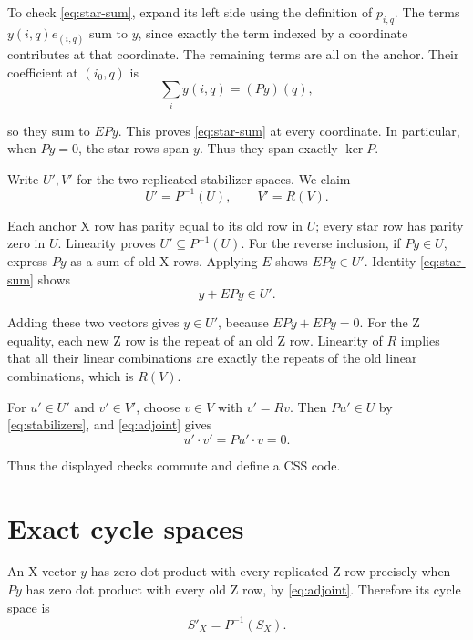 \documentclass{article}
\begin{document}
To check \eqref{eq:star-sum}, expand its left side using the definition of \(p_{i,q}\).
The terms \(y(i,q)e_{(i,q)}\) sum to \(y\), since exactly the term indexed
by a coordinate contributes at that coordinate. The remaining terms
are all on the anchor. Their coefficient at \((i_0,q)\) is
\begin{equation}\label{eq:anchor-coefficient}
\sum_i y(i,q)=(Py)(q),
\end{equation}

so they sum to \(EPy\). This proves \eqref{eq:star-sum} at every coordinate. In particular,
when \(Py=0\), the star rows span \(y\). Thus they span exactly \(\ker P\).

Write \(U',V'\) for the two replicated stabilizer spaces. We claim
\begin{equation}\label{eq:stabilizers}
U'=P^{-1}(U),\qquad V'=R(V).
\end{equation}

Each anchor X row has parity equal to its old row in \(U\); every star
row has parity zero in \(U\). Linearity proves \(U'\subseteq P^{-1}(U)\).
For the reverse inclusion, if \(Py\in U\), express \(Py\) as a sum of old
X rows. Applying \(E\) shows \(EPy\in U'\). Identity \eqref{eq:star-sum} shows
\begin{equation}\label{eq:star-member}
y+EPy\in U'.
\end{equation}

Adding these two vectors gives \(y\in U'\), because \(EPy+EPy=0\).
For the Z equality, each new Z row is the repeat of an old Z row.
Linearity of \(R\) implies that all their linear combinations are exactly
the repeats of the old linear combinations, which is \(R(V)\).

For \(u'\in U'\) and \(v'\in V'\), choose \(v\in V\) with \(v'=Rv\).
Then \(Pu'\in U\) by \eqref{eq:stabilizers}, and \eqref{eq:adjoint} gives
\begin{equation}\label{eq:commutation}
u'\cdot v'=Pu'\cdot v=0.
\end{equation}

Thus the displayed checks commute and define a CSS code.

\section{Exact cycle spaces}\label{sec:cycles}

An X vector \(y\) has zero dot product with every replicated Z row
precisely when \(Py\) has zero dot product with every old Z row, by
\eqref{eq:adjoint}.
Therefore its cycle space is
\begin{equation}\label{eq:x-cycles}
S'_X=P^{-1}(S_X).
\end{equation}
\end{document}
